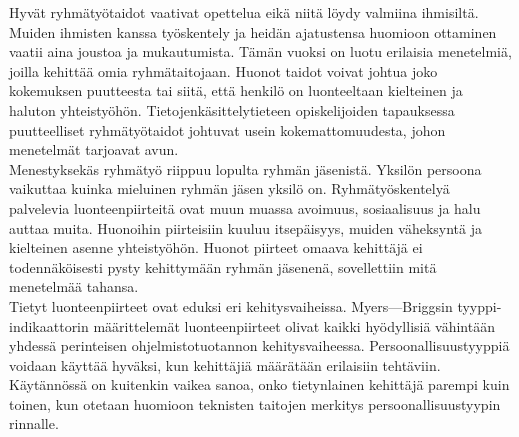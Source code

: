 \documentclass[finnish]{../tktltiki2}
\theoremstyle{definition}
\theoremstyle{remark}
\begin{document}
Hyvät ryhmätyötaidot vaativat opettelua eikä niitä löydy valmiina ihmisiltä. Muiden ihmisten kanssa työskentely ja heidän ajatustensa huomioon ottaminen vaatii aina joustoa ja mukautumista. Tämän vuoksi on luotu erilaisia menetelmiä, joilla kehittää omia ryhmätaitojaan. Huonot taidot voivat johtua joko kokemuksen puutteesta tai siitä, että henkilö on luonteeltaan kielteinen ja haluton yhteistyöhön. Tietojenkäsittelytieteen opiskelijoiden tapauksessa puutteelliset ryhmätyötaidot johtuvat usein kokemattomuudesta, johon menetelmät tarjoavat avun.\\

Menestyksekäs ryhmätyö riippuu lopulta ryhmän jäsenistä. Yksilön persoona vaikuttaa kuinka mieluinen ryhmän jäsen yksilö on. Ryhmätyöskentelyä palvelevia luonteenpiirteitä ovat muun muassa avoimuus, sosiaalisuus ja halu auttaa muita. Huonoihin piirteisiin kuuluu itsepäisyys, muiden väheksyntä ja kielteinen asenne yhteistyöhön. Huonot piirteet omaava kehittäjä ei todennäköisesti pysty kehittymään ryhmän jäsenenä, sovellettiin mitä menetelmää tahansa.\\

Tietyt luonteenpiirteet ovat eduksi eri kehitysvaiheissa. Myers---Briggsin tyyppi-indikaattorin määrittelemät luonteenpiirteet olivat kaikki hyödyllisiä vähintään yhdessä perinteisen ohjelmistotuotannon kehitysvaiheessa. Persoonallisuustyyppiä voidaan käyttää hyväksi, kun kehittäjiä määrätään erilaisiin tehtäviin. Käytännössä on kuitenkin vaikea sanoa, onko tietynlainen kehittäjä parempi kuin toinen, kun otetaan huomioon teknisten taitojen merkitys persoonallisuustyypin rinnalle.\\




\end{document}
